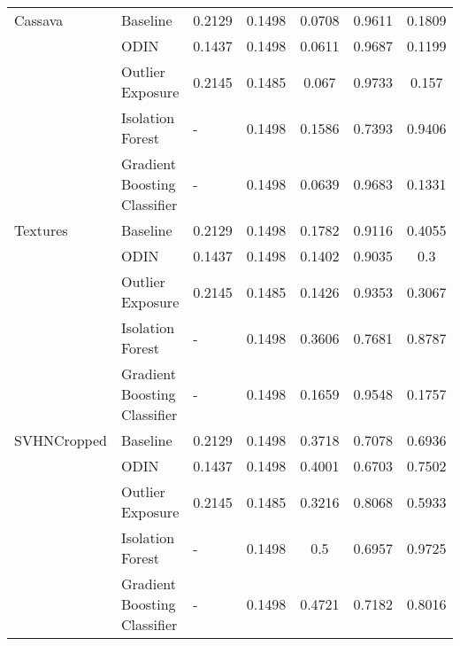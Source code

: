 \documentclass{article}
\begin{document}
\begin{table}[h]
\begin{tabular}{lllHccc}
\midrule
Cassava & Baseline &        0.2129 &               0.1498 &    0.0708 &  0.9611 &         0.1809 \\
            & ODIN &        0.1437 &               0.1498 &    0.0611 &  0.9687 &         0.1199 \\
            & Outlier Exposure &        0.2145 &               0.1485 &     0.067 &  0.9733 &          0.157 \\
            & Isolation Forest &             - &               0.1498 &    0.1586 &  0.7393 &         0.9406 \\
            & Gradient Boosting Classifier &             - &               0.1498 &    0.0639 &  0.9683 &         0.1331 \\
\midrule
Textures & Baseline &        0.2129 &               0.1498 &    0.1782 &  0.9116 &         0.4055 \\
            & ODIN &        0.1437 &               0.1498 &    0.1402 &  0.9035 &            0.3 \\
            & Outlier Exposure &        0.2145 &               0.1485 &    0.1426 &  0.9353 &         0.3067 \\
            & Isolation Forest &             - &               0.1498 &    0.3606 &  0.7681 &         0.8787 \\
            & Gradient Boosting Classifier &             - &               0.1498 &    0.1659 &  0.9548 &         0.1757 \\
\midrule
SVHNCropped & Baseline &        0.2129 &               0.1498 &    0.3718 &  0.7078 &         0.6936 \\
            & ODIN &        0.1437 &               0.1498 &    0.4001 &  0.6703 &         0.7502 \\
            & Outlier Exposure &        0.2145 &               0.1485 &    0.3216 &  0.8068 &         0.5933 \\
            & Isolation Forest &             - &               0.1498 &       0.5 &  0.6957 &         0.9725 \\
            & Gradient Boosting Classifier &             - &               0.1498 &    0.4721 &  0.7182 &         0.8016 \\
\bottomrule
\end{tabular}
\end{table}
\end{document}
